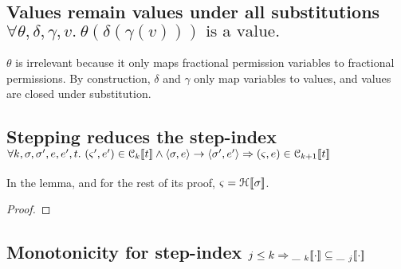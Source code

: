 \subsection{Values remain values under all substitutions
    \texorpdfstring{$\forall \theta, \delta, \gamma, v.\ \theta(\delta(\gamma(v)))\textrm{ is a value.}$}{}
}\label{valueSub}

$\theta$ is irrelevant because it only maps fractional permission variables to
fractional permissions. By construction, $\delta$ and $\gamma$ only map
variables to values, and values are closed under substitution.

\subsection{Stepping reduces the step-index
\texorpdfstring{
    $\forall k, \sigma, \sigma', e, e', t.  \ (\varsigma', e') \in \C{k}{t} \wedge
    \langle \sigma, e \rangle \rightarrow \langle \sigma', e' \rangle
    \Rightarrow (\varsigma, e) \in \C{k+1}{t}
$}{}}\label{stepInC}

In the lemma, and for the rest of its proof, $\varsigma = \mathcal{H}_{} [\![ \sigma ]\!]$.

\begin{proof}




\end{proof}

\subsection{Monotonicity for step-index
    \texorpdfstring{$j \leq k \Rightarrow \mathcal{\_\ }_{k} [\![ \cdot ]\!] \subseteq \mathcal{\_\ }_{j} [\![ \cdot ]\!]$}{}
}\label{subsetKJ}

